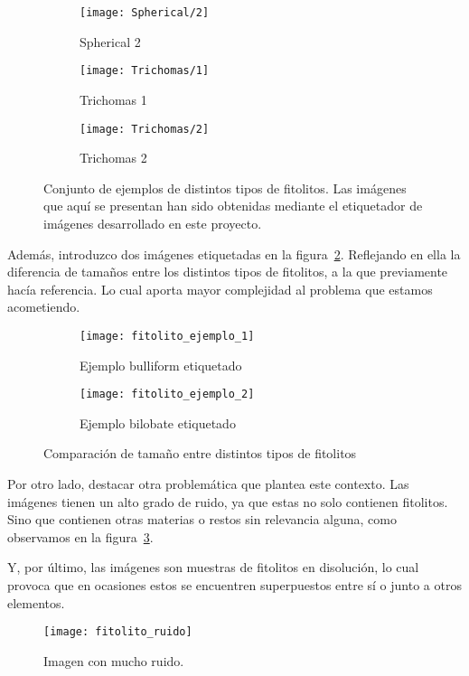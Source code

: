 \begin{figure}
\begin{subfigure}[b]{0.2\textwidth}
        \texttt{[image: Spherical/2]}
        \caption{Spherical 2}
    \end{subfigure}
    \begin{subfigure}[b]{0.2\textwidth}
        \texttt{[image: Trichomas/1]}
        \caption{Trichomas 1}
    \end{subfigure}
    \begin{subfigure}[b]{0.2\textwidth}
        \texttt{[image: Trichomas/2]}
        \caption{Trichomas 2}
    \end{subfigure}
    \caption[Conjunto de ejemplos de distintos tipos de fitolitos.]{Conjunto de ejemplos de distintos tipos de fitolitos. Las imágenes que aquí se presentan han sido obtenidas mediante el etiquetador de imágenes desarrollado en este proyecto.}
	\label{fig:3.1.1}
\end{figure}

Además, introduzco dos imágenes etiquetadas en la figura~\ref{fig:3.1.2}. Reflejando en ella la diferencia de tamaños entre los distintos tipos de fitolitos, a la que previamente hacía referencia. Lo cual aporta mayor complejidad al problema que estamos acometiendo. 

\begin{figure}
	\centering
	\begin{subfigure}[b]{0.8\textwidth}
        \texttt{[image: fitolito\_ejemplo\_1]}
        \caption{Ejemplo bulliform etiquetado}
    \end{subfigure}
    \begin{subfigure}[b]{0.8\textwidth}
        \texttt{[image: fitolito\_ejemplo\_2]}
        \caption{Ejemplo bilobate etiquetado}
    \end{subfigure}
    \caption{Comparación de tamaño entre distintos tipos de fitolitos}
	\label{fig:3.1.2}
\end{figure}

Por otro lado, destacar otra problemática que plantea este contexto. Las imágenes tienen un alto grado de ruido, ya que estas no solo contienen  fitolitos. Sino que contienen otras materias o restos sin relevancia alguna, como observamos en la figura~\ref{fig:3.1.3}. 

Y, por último, las imágenes son muestras de fitolitos en disolución, lo cual provoca que en ocasiones estos se encuentren superpuestos entre sí o junto a otros elementos.

\begin{figure}
\centering
\texttt{[image: fitolito\_ruido]}
\caption{Imagen con mucho ruido.}
\label{fig:3.1.3}
\end{figure}


